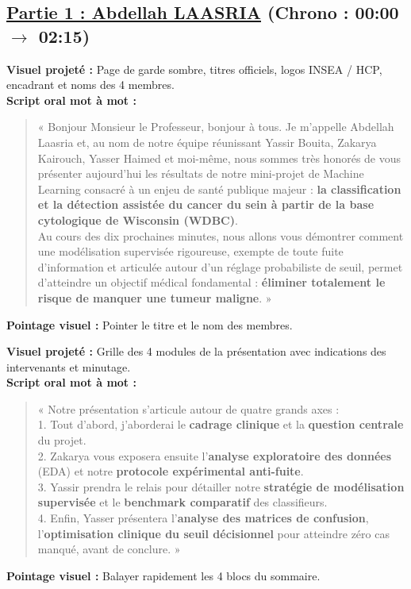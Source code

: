 \documentclass[a4paper,11pt]{article}
\begin{document}
\subsection*{\color{primarygreen}\underline{Partie 1 : Abdellah LAASRIA} (Chrono : 00:00 $\to$ 02:15)}

\begin{tcolorbox}[speechbox, title={Slide 1 : Titre et Accueil du Jury (00:00 -- 00:35)}]
	\textbf{Visuel projeté :} Page de garde sombre, titres officiels, logos INSEA / HCP, encadrant et noms des 4 membres.\\
	\textbf{Script oral mot à mot :}
	\begin{quote}
		« Bonjour Monsieur le Professeur, bonjour à tous. Je m'appelle Abdellah Laasria et, au nom de notre équipe réunissant Yassir Bouita, Zakarya Kairouch, Yasser Haimed et moi-même, nous sommes très honorés de vous présenter aujourd'hui les résultats de notre mini-projet de Machine Learning consacré à un enjeu de santé publique majeur : \textbf{la classification et la détection assistée du cancer du sein à partir de la base cytologique de Wisconsin (WDBC)}.\\
		Au cours des dix prochaines minutes, nous allons vous démontrer comment une modélisation supervisée rigoureuse, exempte de toute fuite d'information et articulée autour d'un réglage probabiliste de seuil, permet d'atteindre un objectif médical fondamental : \textbf{éliminer totalement le risque de manquer une tumeur maligne}. »
	\end{quote}
	\textbf{Pointage visuel :} Pointer le titre et le nom des membres.
\end{tcolorbox}

\begin{tcolorbox}[speechbox, title={Slide 2 : Plan Détaillé de la Présentation / Sommaire (00:35 -- 01:05)}]
	\textbf{Visuel projeté :} Grille des 4 modules de la présentation avec indications des intervenants et minutage.\\
	\textbf{Script oral mot à mot :}
	\begin{quote}
		« Notre présentation s'articule autour de quatre grands axes :\\
		1. Tout d'abord, j'aborderai le \textbf{cadrage clinique} et la \textbf{question centrale} du projet.\\
		2. Zakarya vous exposera ensuite l'\textbf{analyse exploratoire des données} (EDA) et notre \textbf{protocole expérimental anti-fuite}.\\
		3. Yassir prendra le relais pour détailler notre \textbf{stratégie de modélisation supervisée} et le \textbf{benchmark comparatif} des classifieurs.\\
		4. Enfin, Yasser présentera l'\textbf{analyse des matrices de confusion}, l'\textbf{optimisation clinique du seuil décisionnel} pour atteindre zéro cas manqué, avant de conclure. »
	\end{quote}
	\textbf{Pointage visuel :} Balayer rapidement les 4 blocs du sommaire.
\end{tcolorbox}
\end{document}
